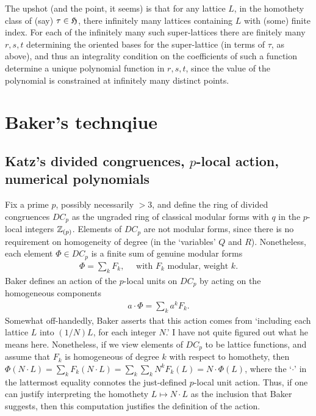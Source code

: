 \documentclass[11pt]{amsart}
\begin{document}
The upshot (and the point, it seems) is that for any lattice $L$, in the homothety class of (say) $\tau \in \mathfrak{H}$, there infinitely many lattices containing $L$ with (some) finite index. For each of the infinitely many such super-lattices there are finitely many $r,s,t$ determining the oriented bases for the super-lattice (in terms of $\tau$, as above), and thus an integrality condition on the coefficients of such a function determine a unique polynomial function in $r,s,t$, since the value of the polynomial is constrained at infinitely many distinct points.


\section{Baker's technqiue}
\subsection{Katz's divided congruences, $p$-local action, numerical polynomials}
Fix a prime $p$, possibly necessarily $>3$, and define the ring of divided congruences $DC_{p}$ as the ungraded ring of classical modular forms with $q$ in the $p$-local integers $\mathbb{Z}_{(p)}$. Elements of $DC_{p}$ are not modular forms, since there is no requirement on homogeneity of degree (in the `variables' $Q$ and $R$). Nonetheless, each element $\Phi \in DC_{p}$ is a finite sum of genuine modular forms
	\begin{align*}
		\Phi=\sum_{k}F_{k}, \quad \text{ with $F_{k}$ modular, weight $k$.}
	\end{align*}
Baker defines an action of the $p$-local units on $DC_{p}$ by acting on the homogeneous components
	\begin{align*}
		a\cdot \Phi=\sum_{k}a^{k}F_{k}.
	\end{align*}
Somewhat off-handedly, Baker asserts that this action comes from `including each lattice $L$ into $(1/N)L$, for each integer $N$.' I have not quite figured out what he means here. Nonetheless, if we view elements of $DC_{p}$ to be lattice functions, and assume that $F_{k}$ is homogeneous of degree $k$ with respect to homothety, then $\Phi(N\cdot L)=\sum_{k}F_{k}(N \cdot L)=\sum_{k} \sum_{k}N^{k}F_{k}(L)=N\cdot \Phi(L)$, where the `$\cdot$' in the lattermost equality connotes the just-defined $p$-local unit action. Thus, if one can justify interpreting the homothety $L\mapsto N\cdot L$ as the inclusion that Baker suggests, then this computation justifies the definition of the action.
\end{document}
